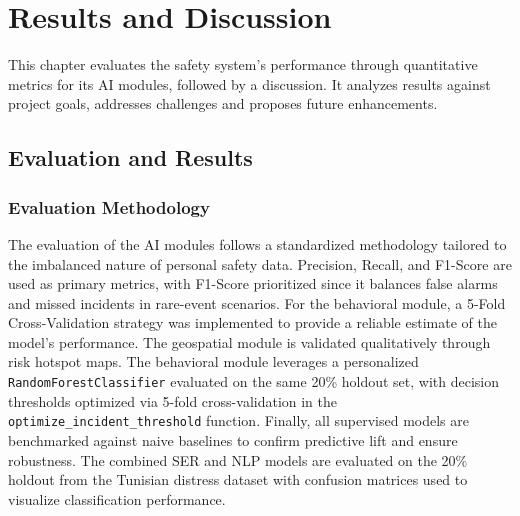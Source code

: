\documentclass[12pt,a4paper,oneside,english]{book}
\begin{document}
\chapter{Results and Discussion}
\label{ch:results_and_disc}

This chapter evaluates the safety system's performance through quantitative metrics for its AI modules, followed by a discussion. 
It analyzes results against project goals, addresses challenges and proposes future enhancements.
\section{Evaluation and Results}
\label{sec:results}

    \subsection{Evaluation Methodology}
    \label{subsec:eval_methodology}


The evaluation of the AI modules follows a standardized methodology tailored to the imbalanced nature of personal safety data. 
Precision, Recall, and F1-Score are used as primary metrics, with F1-Score prioritized since it balances false alarms and missed incidents in rare-event scenarios. 
For the behavioral module, a 5-Fold Cross-Validation strategy was implemented to provide a reliable estimate of the model's performance.
The geospatial module is validated qualitatively through risk hotspot maps. %
The behavioral module leverages a personalized \texttt{RandomForestClassifier} evaluated on the same 20\% holdout set, with decision thresholds optimized via 5-fold cross-validation in the \texttt{optimize\_incident\_threshold} function. Finally, all supervised models are benchmarked against naive baselines to confirm predictive lift and ensure robustness.
The combined SER and NLP models are evaluated on the 20\% holdout from the Tunisian distress dataset with confusion matrices used to visualize classification performance.
\end{document}
